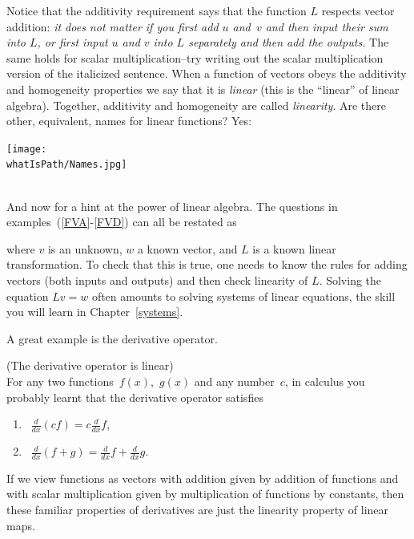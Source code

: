 Notice that the additivity 
requirement says that the function $L$ respects vector addition: {\itshape it does not matter if you first add $u$ and~$v$ and then input their sum into
$L$, or first input $u$ and $v$ into $L$ separately and then add the outputs.} The same holds for scalar multiplication--try writing out the scalar multiplication version of the italicized sentence. When a function of vectors obeys the additivity and homogeneity properties we say that it is {\itshape linear} (this is the ``linear'' of linear algebra). Together, additivity and homogeneity are called {\itshape linearity}. 
Are there other, equivalent, names for linear functions? Yes:
\begin{center}
\texttt{[image: \\whatIsPath/Names.jpg]}
\\
\\
\end{center}

And now for a hint at the power of linear algebra. 
The questions in examples~(\ref{FVA}-\ref{FVD}) can all be restated as %
\begin{center}
\end{center}
where $v$ is an unknown, $w$ a known vector, and $L$ is  a known linear transformation.
To check that this is true, one needs to know the rules for adding vectors (both inputs and outputs)
and then check linearity of $L$. Solving the equation $Lv=w$ often amounts  to solving systems of linear equations,
the skill you will learn in  Chapter~\ref{systems}.



A great example is the derivative operator.
\begin{example} (The derivative operator is linear)\\
For any two functions~$f(x)$,~$g(x)$ and any number~$c$, in calculus you probably learnt that the derivative operator satisfies
\begin{enumerate}
\item ~$\frac{d}{dx} (cf)=c\frac{d}{dx} f$, \\[-.5cm]
\item~$\frac{d}{dx}(f+g)=\frac{d}{dx}f+\frac{d}{dx}g$.\\[-.5cm]
\end{enumerate}
If we view functions  as vectors with addition given by addition of functions and with scalar multiplication given by multiplication of functions by constants, then these familiar properties of derivatives are just the linearity property of linear maps.
\end{example}

